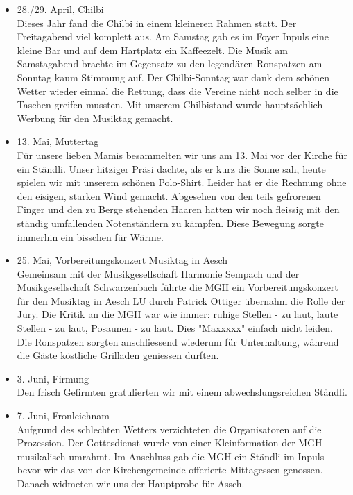 \begin{history}
\begin{itemize}
        \item[]28./29. April, Chilbi\\
        Dieses Jahr fand die Chilbi in einem kleineren Rahmen statt. Der
        Freitagabend viel komplett aus. Am Samstag gab es im Foyer Inpuls eine
        kleine Bar und auf dem Hartplatz ein Kaffeezelt. Die Musik am
        Samstagabend brachte im Gegensatz zu den legendären Ronspatzen am
        Sonntag kaum Stimmung auf. Der Chilbi-Sonntag war dank dem schönen
        Wetter wieder einmal die Rettung, dass die Vereine nicht noch selber in
        die Taschen greifen mussten. Mit unserem Chilbistand wurde hauptsächlich
        Werbung für den Musiktag gemacht.

        \item[]13. Mai, Muttertag\\
        Für unsere lieben Mamis besammelten wir uns am 13. Mai vor der Kirche
        für ein Ständli. Unser hitziger Präsi dachte, als er kurz die Sonne sah,
        heute spielen wir mit unserem schönen Polo-Shirt. Leider hat er die
        Rechnung ohne den eisigen, starken Wind gemacht. Abgesehen von den teils
        gefrorenen Finger und den zu Berge stehenden Haaren hatten wir noch
        fleissig mit den ständig umfallenden Notenständern zu kämpfen. Diese
        Bewegung sorgte immerhin ein bisschen für Wärme.

        \item[]25. Mai, Vorbereitungskonzert Musiktag in Aesch\\
        Gemeinsam mit der Musikgesellschaft Harmonie Sempach und der
        Musikgesellschaft Schwarzenbach führte die MGH ein Vorbereitungskonzert
        für den Musiktag in Aesch LU durch Patrick Ottiger übernahm die Rolle
        der Jury. Die Kritik an die MGH war wie immer: ruhige Stellen - zu laut,
        laute Stellen - zu laut, Posaunen - zu laut. Dies "Maxxxxx" einfach
        nicht leiden. Die Ronspatzen sorgten anschliessend wiederum für
        Unterhaltung, während die Gäste köstliche Grilladen geniessen durften.

        \item[]3. Juni, Firmung\\
        Den frisch Gefirmten gratulierten wir mit einem abwechslungsreichen
        Ständli.

        \item[]7. Juni, Fronleichnam\\
        Aufgrund des schlechten Wetters verzichteten die Organisatoren auf die
        Prozession. Der Gottesdienst wurde von einer Kleinformation der MGH
        musikalisch umrahmt. Im Anschluss gab die MGH ein Ständli im Inpuls
        bevor wir das von der Kirchengemeinde offerierte Mittagessen genossen.
        Danach widmeten wir uns der Hauptprobe für Assch.


\end{itemize}
\end{history}
